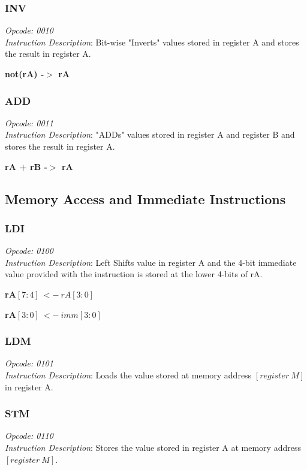 \documentclass{article}
\begin{document}
\subsubsection{INV}
\textit{Opcode: 0010}  \\
\textit{Instruction Description}:  Bit-wise "Inverts" values stored in
register A and stores the result in register A. \\
\begin{center}\textbf{not(rA) -$>$ rA}\end{center}

\subsubsection{ADD}
\textit{Opcode: 0011}  \\
\textit{Instruction Description}:  "ADDs" values stored in
register A and register B and stores the result in register A.
\begin{center} \textbf{rA + rB -$>$ rA} \end{center}

\subsection{Memory Access and Immediate Instructions}

\subsubsection{LDI}
\textit{Opcode: 0100}  \\
\textit{Instruction Description}:  Left Shifts value in register A and the
4-bit immediate value provided with the instruction is stored at the
lower 4-bits of rA.
\begin{center} \textbf{rA$[7:4] ~<- ~rA[3:0]$} \end{center}
\begin{center} \textbf{rA$[3:0] ~<- ~imm[3:0]$} \end{center}

\subsubsection{LDM}
\textit{Opcode: 0101}  \\
\textit{Instruction Description}:  Loads the value stored at memory
address $[register ~M]$ in register A.

\subsubsection{STM}
\textit{Opcode: 0110}  \\
\textit{Instruction Description}:  Stores the value stored in register
A at memory address $[register ~M]$.
\end{document}

